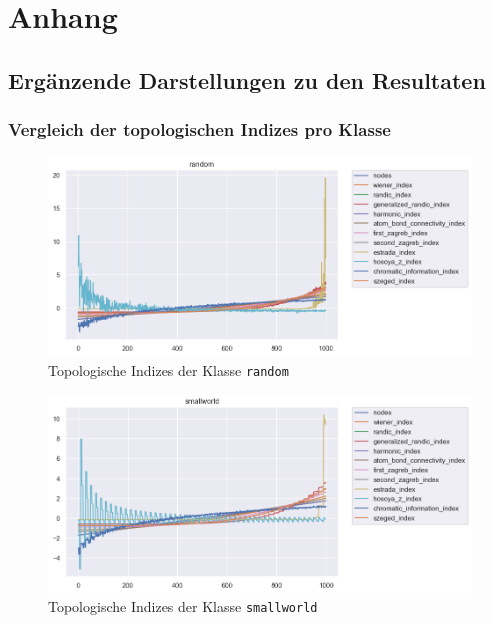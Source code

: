 \appendix

\chapter{Anhang}

\section{Ergänzende Darstellungen zu den Resultaten}

\subsection{Vergleich der topologischen Indizes pro Klasse} \label{sec:compare-ti-classes}

\begin{figure}[H]
    \centering
    \includegraphics[width=\textwidth]{images/30_results/random-ti-comparison.png}
    \caption{Topologische Indizes der Klasse \texttt{random}}
    \label{fig:big-ti-comparison-random}
\end{figure}
\begin{figure}[H]
    \centering
    \includegraphics[width=\textwidth]{images/30_results/smallworld-ti-comparison.png}
    \caption{Topologische Indizes der Klasse \texttt{smallworld}}
    \label{fig:big-ti-comparison-smallworld}
\end{figure}

